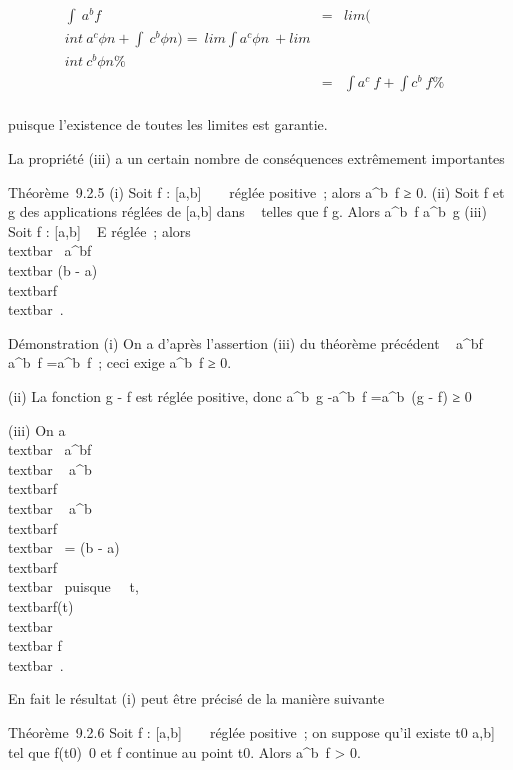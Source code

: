 \begin{align*} \int ~
a^bf& =&
lim(\\int ~
a^c\phi n +\int ~
c^b\phi n) =\
lim\int  a^c\phi n~
+ lim\\int ~
c^b\phi n\%& \\ &
=& \int  a^c~f
+\int  c^b~f \%&
\\ \end{align*}

puisque l'existence de toutes les limites est garantie.

La propriété (iii) a un certain nombre de conséquences extrêmement
importantes

Théorème~9.2.5 (i) Soit f : {[}a,b{]} \rightarrow~ ~ réglée positive~; alors
\int  a^b~f ≥ 0. (ii) Soit f et g
des applications réglées de {[}a,b{]} dans ~ telles que f \leq g. Alors
\int  a^b~f
\leq\int  a^b~g (iii) Soit f :
{[}a,b{]} \rightarrow~ E réglée~; alors
\\textbar{}\int ~
a^bf\\textbar{} \leq (b -
a)\\textbar{}f\\textbar{}\infty~.

Démonstration (i) On a d'après l'assertion (iii) du théorème précédent
\left \textbar{}\int ~
a^bf\right \textbar{}
\leq\int  a^b~\textbar{}f\textbar{}
=\int  a^b~f~; ceci exige
\int  a^b~f ≥ 0.

(ii) La fonction g - f est réglée positive, donc
\int  a^b~g
-\int  a^b~f
=\int  a^b~(g - f) ≥ 0

(iii) On a \\textbar{}\int ~
a^bf\\textbar{}
\leq\int ~
a^b\\textbar{}f\\textbar{}
\leq\int ~
a^b\\textbar{}f\\textbar{}\infty~
= (b - a)\\textbar{}f\\textbar{}\infty~ puisque
\forall~~t,
\\textbar{}f(t)\\textbar{}
\leq\\textbar{} f\\textbar{}\infty~.

En fait le résultat (i) peut être précisé de la manière suivante

Théorème~9.2.6 Soit f : {[}a,b{]} \rightarrow~ ~ réglée positive~; on suppose qu'il
existe t0 \in {[}a,b{]} tel que
f(t0)\neq~0 et f continue au point
t0. Alors \int  a^b~f
\textgreater{} 0.

